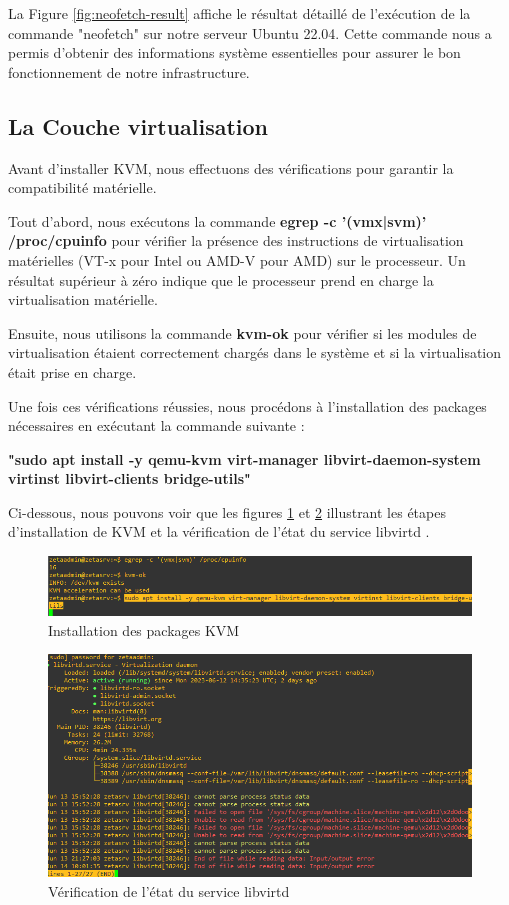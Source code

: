 La Figure \ref{fig:neofetch-result} affiche le résultat détaillé de l'exécution de la commande "neofetch" sur notre serveur Ubuntu 22.04. Cette commande nous a permis d'obtenir des informations système essentielles pour assurer le bon fonctionnement de notre infrastructure.


\subsection{La Couche virtualisation}

Avant d'installer KVM, nous effectuons des vérifications pour garantir la compatibilité matérielle. 

Tout d'abord, nous exécutons la commande \textbf{egrep -c '(vmx|svm)' /proc/cpuinfo} pour vérifier la présence des instructions de virtualisation matérielles (VT-x pour Intel ou AMD-V pour AMD) sur le processeur. Un résultat supérieur à zéro indique que le processeur prend en charge la virtualisation matérielle.

Ensuite, nous utilisons la commande \textbf{kvm-ok} pour vérifier si les modules de virtualisation étaient correctement chargés dans le système et si la virtualisation était prise en charge.

Une fois ces vérifications réussies, nous procédons à l'installation des packages nécessaires en exécutant la commande suivante :

\textbf{"sudo apt install -y qemu-kvm virt-manager libvirt-daemon-system virtinst libvirt-clients bridge-utils"}

Ci-dessous, nous pouvons voir que les figures \ref{fig:kvm-installation} et \ref{fig:libvirtd-status} illustrant les étapes d'installation de KVM et la vérification de l'état du service libvirtd  .

\begin{figure}[H]
 \centering
    \includegraphics[width=15cm]{Images/installkvm1.png}
    \caption{Installation des packages KVM}
    \label{fig:kvm-installation}
\end{figure}

\begin{figure}[H]
 \centering
    \includegraphics[width=15cm]{Images/installkvm2.png}
    \caption{Vérification de l'état du service libvirtd}
    \label{fig:libvirtd-status}
\end{figure}

